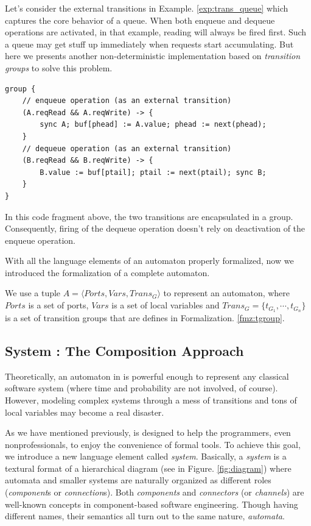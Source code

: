 \begin{example} Let's consider the external transitions in Example. \ref{exp:trans_queue} which captures the core behavior of a queue. When both enqueue and dequeue operations are activated, in that example, reading will always be fired first. Such a queue may get stuff up immediately when requests start accumulating. But here we presents another non-deterministic implementation based on \emph{transition groups} to solve this problem.
\begin{lstlisting}
group {
    // enqueue operation (as an external transition)
    (A.reqRead && A.reqWrite) -> {
        sync A; buf[phead] := A.value; phead := next(phead);
    }
    // dequeue operation (as an external transition)
    (B.reqRead && B.reqWrite) -> {
        B.value := buf[ptail]; ptail := next(ptail); sync B;
    }
}
\end{lstlisting}
In this code fragment above, the two transitions are encapsulated in a group. Consequently, firing of the dequeue operation doesn't rely on deactivation of the enqueue operation.
\label{exp:transgroup_queue}
\end{example}

With all the language elements of an automaton properly formalized, now we introduced the formalization of a complete automaton.

\begin{formalization}[Automata]
    \label{fmz:automata}
    We use a tuple $A=\langle Ports, Vars, Trans_G \rangle$ to represent an automaton, where $Ports$ is a set of ports, $Vars$ is a set of local variables and $Trans_G=\{t_{G_1},\cdots,t_{G_n}\}$ is a set of transition groups that are defines in Formalization. \ref{fmz:tgroup}.
\end{formalization}

\subsection{System : The Composition Approach}
\label{subsec:system}

Theoretically, an automaton in \lang{} is powerful enough to represent any classical software system (where time and probability are not involved, of course). However, modeling complex systems through a mess of transitions and tons of local variables may become a real disaster.

As we have mentioned previously, \lang{} is designed to help the programmers, even nonprofessionals, to enjoy the convenience of formal tools. To achieve this goal, we introduce a new language element called \emph{system}. Basically, a \emph{system} is a textural format of a hierarchical diagram (see in Figure. \ref{fig:diagram}) where automata and smaller systems are naturally organized as different roles (\emph{component}s or 
\emph{connection}s). Both \emph{components} and \emph{connectors} (or \emph{channels}) are well-known concepts in component-based software engineering. Though having different names, their semantics all turn out to the same nature, \emph{automata}.


